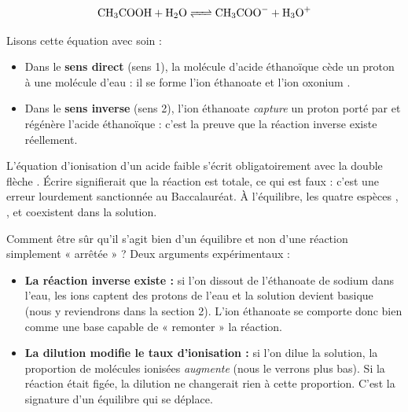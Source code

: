 \documentclass[11pt]{article}
\newcommand{\cle}[1]{{\popxbold\color{popdark}#1}}
\begin{document}
\[ \ce{CH3COOH + H2O <=> CH3COO- + H3O+} \]

Lisons cette équation avec soin :
\begin{itemize}
\item Dans le \textbf{sens direct} (sens 1), la molécule d'acide éthanoïque  cède un proton  à une molécule d'eau : il se forme l'\cle{ion éthanoate}  et l'\cle{ion oxonium} .
\item Dans le \textbf{sens inverse} (sens 2), l'ion éthanoate  \emph{capture} un proton porté par  et régénère l'acide éthanoïque : c'est la preuve que la réaction inverse existe réellement.
\end{itemize}

\begin{attention}
L'équation d'ionisation d'un acide faible s'écrit obligatoirement avec la double flèche \ce{<=>}. Écrire  signifierait que la réaction est totale, ce qui est faux : c'est une erreur lourdement sanctionnée au Baccalauréat. À l'équilibre, les quatre espèces , ,  et  coexistent dans la solution.
\end{attention}

Comment être sûr qu'il s'agit bien d'un équilibre et non d'une réaction simplement « arrêtée » ? Deux arguments expérimentaux :
\begin{itemize}
\item \textbf{La réaction inverse existe :} si l'on dissout de l'éthanoate de sodium  dans l'eau, les ions  captent des protons de l'eau et la solution devient basique (nous y reviendrons dans la section 2). L'ion éthanoate se comporte donc bien comme une base capable de « remonter » la réaction.
\item \textbf{La dilution modifie le taux d'ionisation :} si l'on dilue la solution, la proportion de molécules ionisées \emph{augmente} (nous le verrons plus bas). Si la réaction était figée, la dilution ne changerait rien à cette proportion. C'est la signature d'un équilibre qui se déplace.
\end{itemize}
\end{document}
